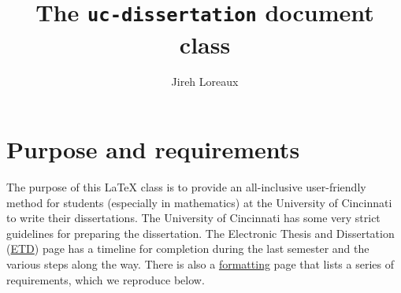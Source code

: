 \documentclass{article}
\title{The \texttt{uc-dissertation} document class}
\author{Jireh Loreaux}
\begin{document}
\lstset{style=tex-command-syntax}

\maketitle

\section{Purpose and requirements}

The purpose of this \LaTeX{} class is to provide an all-inclusive user-friendly method for students (especially in mathematics) at the University of Cincinnati to write their dissertations. 
The University of Cincinnati has some very strict guidelines for preparing the dissertation.
The Electronic Thesis and Dissertation (\href{http://grad.uc.edu/student-life/etd.html}{ETD}) page has a timeline for completion during the last semester and the various steps along the way.
There is also a \href{http://grad.uc.edu/student-life/etd/formatting.html}{formatting} page that lists a series of requirements, which we reproduce below.
\end{document}
